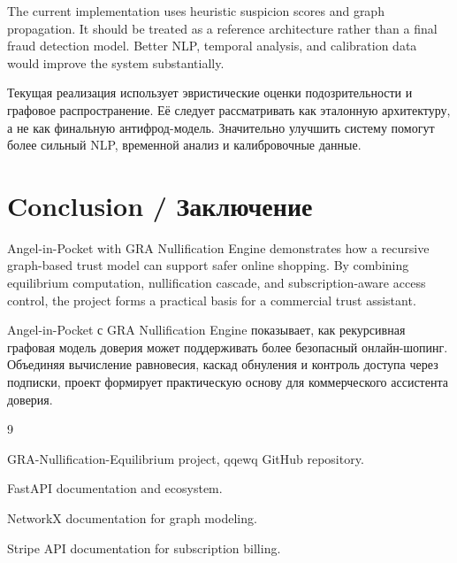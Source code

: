 \documentclass[12pt,a4paper]{article}
\begin{document}
The current implementation uses heuristic suspicion scores and graph propagation. It should be treated as a reference architecture rather than a final fraud detection model. Better NLP, temporal analysis, and calibration data would improve the system substantially.

Текущая реализация использует эвристические оценки подозрительности и графовое распространение. Её следует рассматривать как эталонную архитектуру, а не как финальную антифрод-модель. Значительно улучшить систему помогут более сильный NLP, временной анализ и калибровочные данные.

\section{Conclusion / Заключение}

Angel-in-Pocket with GRA Nullification Engine demonstrates how a recursive graph-based trust model can support safer online shopping. By combining equilibrium computation, nullification cascade, and subscription-aware access control, the project forms a practical basis for a commercial trust assistant.

Angel-in-Pocket с GRA Nullification Engine показывает, как рекурсивная графовая модель доверия может поддерживать более безопасный онлайн-шопинг. Объединяя вычисление равновесия, каскад обнуления и контроль доступа через подписки, проект формирует практическую основу для коммерческого ассистента доверия.

\begin{thebibliography}{9}

GRA-Nullification-Equilibrium project, qqewq GitHub repository.

FastAPI documentation and ecosystem.

NetworkX documentation for graph modeling.

Stripe API documentation for subscription billing.

\end{thebibliography}
\end{document}
